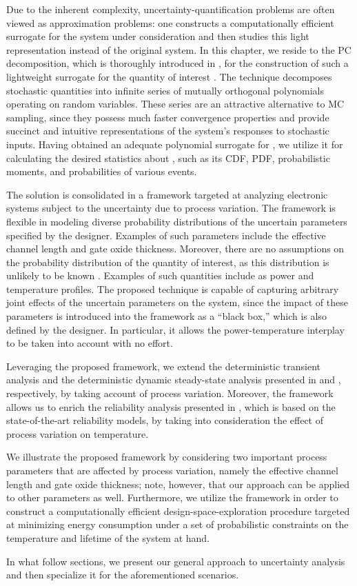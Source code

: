 Due to the inherent complexity, uncertainty-quantification problems are often
viewed as approximation problems: one constructs a computationally efficient
surrogate for the system under consideration and then studies this light
representation instead of the original system. In this chapter, we reside to the
\ac{PC} decomposition, which is thoroughly introduced in
, for the construction of such a lightweight surrogate
for the quantity of interest \g. The technique decomposes stochastic quantities
into infinite series of mutually orthogonal polynomials operating on random
variables. These series are an attractive alternative to \ac{MC} sampling, since
they possess much faster convergence properties and provide succinct and
intuitive representations of the system's responses to stochastic inputs. Having
obtained an adequate polynomial surrogate for \g, we utilize it for calculating
the desired statistics about \g, such as its \ac{CDF}, \ac{PDF}, probabilistic
moments, and probabilities of various events.

The solution is consolidated in a framework targeted at analyzing electronic
systems subject to the uncertainty due to process variation. The framework is
flexible in modeling diverse probability distributions of the uncertain
parameters specified by the designer. Examples of such parameters include the
effective channel length and gate oxide thickness. Moreover, there are no
assumptions on the probability distribution of the quantity of interest, as this
distribution is unlikely to be known \apriori. Examples of such quantities
include as power and temperature profiles. The proposed technique is capable of
capturing arbitrary joint effects of the uncertain parameters on the system,
since the impact of these parameters is introduced into the framework as a
``black box,'' which is also defined by the designer. In particular, it allows
the power-temperature interplay to be taken into account with no effort.

Leveraging the proposed framework, we extend the deterministic transient
analysis and the deterministic dynamic steady-state analysis presented in
 and , respectively, by
taking account of process variation. Moreover, the framework allows us to enrich
the reliability analysis presented in , which is based
on the state-of-the-art reliability models, by taking into consideration the
effect of process variation on temperature.

We illustrate the proposed framework by considering two important process
parameters that are affected by process variation, namely the effective channel
length and gate oxide thickness; note, however, that our approach can be applied
to other parameters as well. Furthermore, we utilize the framework in order to
construct a computationally efficient design-space-exploration procedure
targeted at minimizing energy consumption under a set of probabilistic
constraints on the temperature and lifetime of the system at hand.

In what follow sections, we present our general approach to uncertainty analysis
and then specialize it for the aforementioned scenarios.
